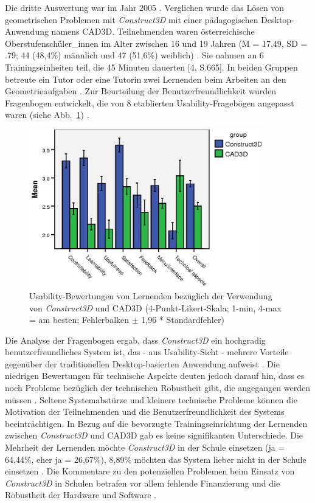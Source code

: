 \documentclass[deutsch]{llncs}
\begin{document}
 Die dritte Auswertung war im Jahr 2005 \cite{Kaufmann_summaryof}. Verglichen wurde das Lösen von geometrischen Problemen mit \emph{Construct3D} mit einer pädagogischen Desktop-Anwendung namens CAD3D. Teilnehmenden waren österreichische Oberstufenschüler\_innen im Alter zwischen 16 und 19 Jahren (M = 17,49, SD = .79; 44 (48,4\%) männlich und 47 (51,6\%) weiblich) \cite{Kaufmann_summaryof}. Sie nahmen an 6 Trainingseinheiten teil, die 45 Minuten dauerten [4, S.665]. In beiden Gruppen betreute ein Tutor oder eine Tutorin zwei Lernenden beim Arbeiten an den Geometrieaufgaben  \cite{Kaufmann_summaryof}. Zur Beurteilung der Benutzerfreundlichkeit wurden Fragenbogen entwickelt, die von 8 etablierten Usability-Fragebögen angepasst waren (siehe Abb.~\ref{fig:stat1})  \cite{Kaufmann_summaryof}.
\begin{figure}[t]
	\centering
	\includegraphics[width=0.9\textwidth]{figures/stat1}
	\caption{Usability-Bewertungen von Lernenden bezüglich der Verwendung von \emph{Construct3D} und CAD3D (4-Punkt-Likert-Skala; 1-min, 4-max = am besten; Fehlerbalken $\pm$ 1,96 * Standardfehler)\cite{Kaufmann_summaryof}}
	\label{fig:stat1}
\end{figure}
Die Analyse der Fragenbogen ergab, dass \emph{Construct3D} ein hochgradig benutzerfreundliches System ist, das - aus Usability-Sicht - mehrere Vorteile gegenüber der traditionellen Desktop-basierten Anwendung aufweist \cite{Kaufmann_summaryof}. Die niedrigen Bewertungen für technische Aspekte deuten jedoch darauf hin, dass es noch Probleme bezüglich der technischen Robustheit gibt, die angegangen werden müssen \cite{Kaufmann_summaryof}. Seltene Systemabstürze und kleinere technische Probleme können die Motivation der Teilnehmenden und die Benutzerfreundlichkeit des Systems beeinträchtigen. In Bezug auf die bevorzugte Trainingseinrichtung der Lernenden zwischen \emph{Construct3D} und CAD3D gab es keine signifikanten Unterschiede. Die Mehrheit der Lernenden möchte \emph{Construct3D} in der Schule einsetzen (ja = 64,44\%, eher ja = 26,67\%), 8,89\% möchten das System lieber nicht in der Schule einsetzen \cite{Kaufmann_summaryof}.  Die Kommentare zu den potenziellen Problemen beim Einsatz von \emph{Construct3D} in Schulen betrafen vor allem fehlende Finanzierung und die Robustheit der Hardware und Software \cite{Kaufmann_summaryof}.\\
\end{document}
